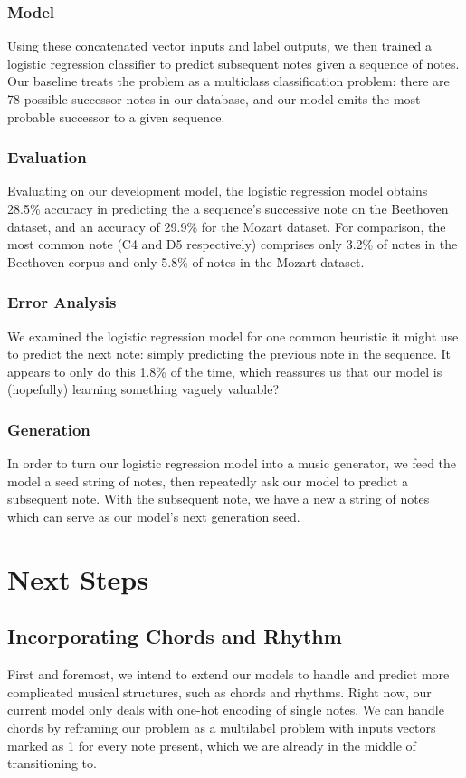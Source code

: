 \documentclass[twoside,twocolumn]{article}
\begin{document}
\subsubsection{Model}
Using these concatenated vector inputs and label outputs, we then trained a logistic regression classifier to predict subsequent notes given a sequence of notes. Our baseline treats the problem as a multiclass classification problem: there are 78 possible successor notes in our database, and our model emits the most probable successor to a given sequence.

\subsubsection{Evaluation}
Evaluating on our development model, the logistic regression model obtains 28.5\% accuracy in predicting the a sequence's successive note on the Beethoven dataset, and an accuracy of 29.9\% for the Mozart dataset. For comparison, the most common note (C4 and D5 respectively) comprises only 3.2\% of notes in the Beethoven corpus and only 5.8\% of notes in the Mozart dataset.

\subsubsection{Error Analysis}
We examined the logistic regression model for one common heuristic it might use to predict the next note: simply predicting the previous note in the sequence. It appears to only do this 1.8\% of the time, which reassures us that our model is (hopefully) learning something vaguely valuable?

\subsubsection{Generation}
In order to turn our logistic regression model into a music generator, we feed the model a seed string of notes, then repeatedly ask our model to predict a subsequent note. With the subsequent note, we have a new a string of notes which can serve as our model's next generation seed.


\section{Next Steps}

\subsection{Incorporating Chords and Rhythm}
First and foremost, we intend to extend our models to handle and predict more complicated musical structures, such as chords and rhythms. Right now, our current model only deals with one-hot encoding of single notes. We can handle chords by reframing our problem as a multilabel problem with inputs vectors marked as 1 for every note present, which we are already in the middle of transitioning to.
\end{document}
